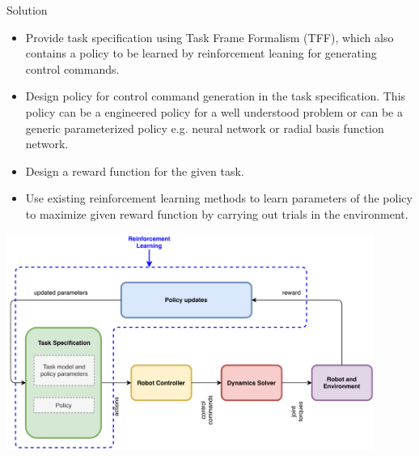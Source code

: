 \documentclass[aspectratio=169]{beamer}
\begin{document}
\begin{frame}{Solution}
	\begin{itemize}
		
		\item Provide task specification using Task Frame Formalism (TFF), which also contains a policy to be learned by reinforcement leaning for generating control commands.
		
		\item Design policy for control command generation in the task specification. This policy can be a engineered policy for a well understood problem or can be a generic parameterized policy e.g. neural network or radial basis function network.
		
		\item Design a reward function for the given task.
		
		\item Use existing reinforcement learning methods to learn parameters of the policy to maximize given reward function by carrying out trials in the environment.
	\end{itemize}
\end{frame}
\begin{frame}
		\vspace{-0.5cm}\hspace{0.5cm}
	\includegraphics[width=0.9\textwidth]{images/composition}
\end{frame}
\end{document}
